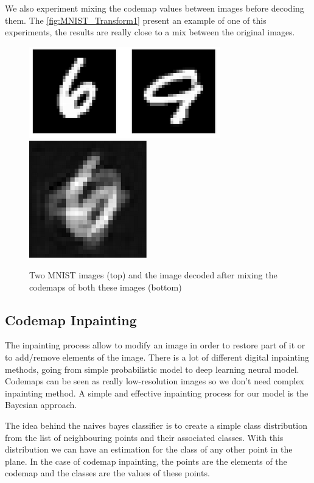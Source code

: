 \documentclass{article}
\begin{document}
We also experiment mixing the codemap values between images before decoding them. The \autoref{fig:MNIST_Transform1} present an example of one of this experiments, the results are really close to a mix between the original images.

\begin{figure}[ht]
    \centering
    \includegraphics[width=0.8\columnwidth]{experiments/MNIST_transformations/1_orig.PNG}
    \includegraphics[width=0.4\columnwidth]{experiments/MNIST_transformations/1_mix.PNG}
    \caption{Two MNIST images (top) and the image decoded after mixing the codemaps of both these images (bottom)}
    \label{fig:MNIST_Transform1}
\end{figure}

\subsection{Codemap Inpainting}

The inpainting process allow to modify an image in order to restore part of it or to add/remove elements of the image. There is a lot of different digital inpainting methods, going from simple probabilistic model to deep learning neural model. Codemaps can be seen as really low-resolution images so we don't need complex inpainting method. A simple and effective inpainting process for our model is the Bayesian approach.

The idea behind the naives bayes classifier is to create a simple class distribution from the list of neighbouring points and their associated classes. With this distribution we can have an estimation for the class of any other point in the plane. In the case of codemap inpainting, the points are the elements of the codemap and the classes are the values of these points.
\end{document}
